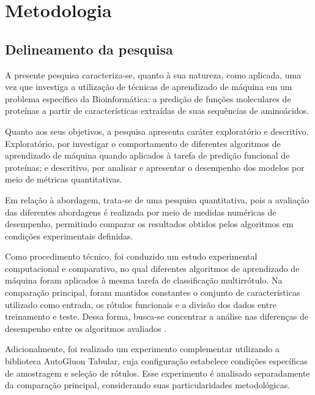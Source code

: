 
\section{Metodologia}
\label{sec:metodologia}

\subsection{Delineamento da pesquisa}
\label{subsec:delineamento}

A presente pesquisa caracteriza-se, quanto à sua natureza, como aplicada, uma vez que investiga a utilização de técnicas de aprendizado de máquina em um problema específico da Bioinformática: a predição de funções moleculares de proteínas a partir de características extraídas de suas sequências de aminoácidos.

Quanto aos seus objetivos, a pesquisa apresenta caráter exploratório e descritivo. Exploratório, por investigar o comportamento de diferentes algoritmos de aprendizado de máquina quando aplicados à tarefa de predição funcional de proteínas; e descritivo, por analisar e apresentar o desempenho dos modelos por meio de métricas quantitativas.

Em relação à abordagem, trata-se de uma pesquisa quantitativa, pois a avaliação das diferentes abordagens é realizada por meio de medidas numéricas de desempenho, permitindo comparar os resultados obtidos pelos algoritmos em condições experimentais definidas.

Como procedimento técnico, foi conduzido um estudo experimental computacional e comparativo, no qual diferentes algoritmos de aprendizado de máquina foram aplicados à mesma tarefa de classificação multirrótulo. Na comparação principal, foram mantidos constantes o conjunto de características utilizado como entrada, os rótulos funcionais e a divisão dos dados entre treinamento e teste. Dessa forma, busca-se concentrar a análise nas diferenças de desempenho entre os algoritmos avaliados \cite{prodanov2013}.

Adicionalmente, foi realizado um experimento complementar utilizando a biblioteca AutoGluon Tabular, cuja configuração estabelece condições específicas de amostragem e seleção de rótulos. Esse experimento é analisado separadamente da comparação principal, considerando suas particularidades metodológicas.


